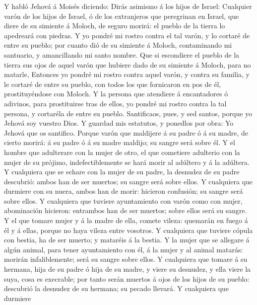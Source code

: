  Y habló Jehová á Moisés diciendo:  Dirás
asimismo á los hijos de Israel: Cualquier varón de los hijos de Israel,
ó de los extranjeros que peregrinan en Israel, que diere de su simiente
á Moloch, de seguro morirá: el pueblo de la tierra lo apedreará con
piedras.  Y yo pondré mi rostro contra el tal varón, y lo
cortaré de entre su pueblo; por cuanto dió de su simiente á Moloch,
contaminando mi santuario, y amancillando mi santo nombre.
 Que si escondiere el pueblo de la tierra sus ojos de
aquel varón que hubiere dado de su simiente á Moloch, para no matarle,
 Entonces yo pondré mi rostro contra aquel varón, y contra
su familia, y le cortaré de entre su pueblo, con todos los que
fornicaron en pos de él, prostituyéndose con Moloch.  Y la
persona que atendiere á encantadores ó adivinos, para prostituirse tras
de ellos, yo pondré mi rostro contra la tal persona, y cortaréla de
entre su pueblo.  Santificaos, pues, y sed santos, porque
yo Jehová soy vuestro Dios.  Y guardad mis estatutos, y
ponedlos por obra: Yo Jehová que os santifico.  Porque
varón que maldijere á su padre ó á su madre, de cierto morirá: á su
padre ó á su madre maldijo; su sangre será sobre él.  Y
el hombre que adulterare con la mujer de otro, el que cometiere
adulterio con la mujer de su prójimo, indefectiblemente se hará morir al
adúltero y á la adúltera.  Y cualquiera que se echare con
la mujer de su padre, la desnudez de su padre descubrió: ambos han de
ser muertos; su sangre será sobre ellos.  Y cualquiera
que durmiere con su nuera, ambos han de morir: hicieron confusión; su
sangre será sobre ellos.  Y cualquiera que tuviere
ayuntamiento con varón como con mujer, abominación hicieron: entrambos
han de ser muertos; sobre ellos será su sangre.  Y el que
tomare mujer y á la madre de ella, comete vileza: quemarán en fuego á él
y á ellas, porque no haya vileza entre vosotros.  Y
cualquiera que tuviere cópula con bestia, ha de ser muerto; y mataréis á
la bestia.  Y la mujer que se allegare á algún animal,
para tener ayuntamiento con él, á la mujer y al animal matarás: morirán
infaliblemente; será su sangre sobre ellos.  Y cualquiera
que tomare á su hermana, hija de su padre ó hija de su madre, y viere su
desnudez, y ella viere la suya, cosa es execrable; por tanto serán
muertos á ojos de los hijos de su pueblo: descubrió la desnudez de su
hermana; su pecado llevará.  Y cualquiera que durmiere

